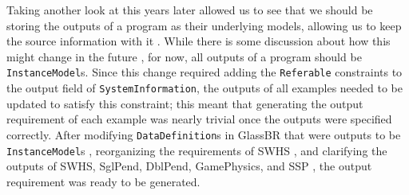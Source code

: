 Taking another look at this  years later allowed us to
see that we should be storing the outputs of a program as their underlying
models, allowing us to keep the source information with it
. While there is some discussion about how this might
change in the future , for now, all outputs of a program should be
\texttt{InstanceModel}s. Since this change required adding the
\texttt{Referable}  constraints to the output field of
\texttt{SystemInformation}, the outputs of all examples needed to be updated to
satisfy this constraint; this meant that generating the output requirement of
each example was nearly trivial once the outputs were specified correctly.
After modifying \texttt{DataDefinition}s in GlassBR that were outputs to be
\texttt{InstanceModel}s , reorganizing the requirements of
SWHS , and clarifying the outputs of SWHS, SglPend, DblPend,
GamePhysics, and SSP , the output requirement was ready to
be generated.
